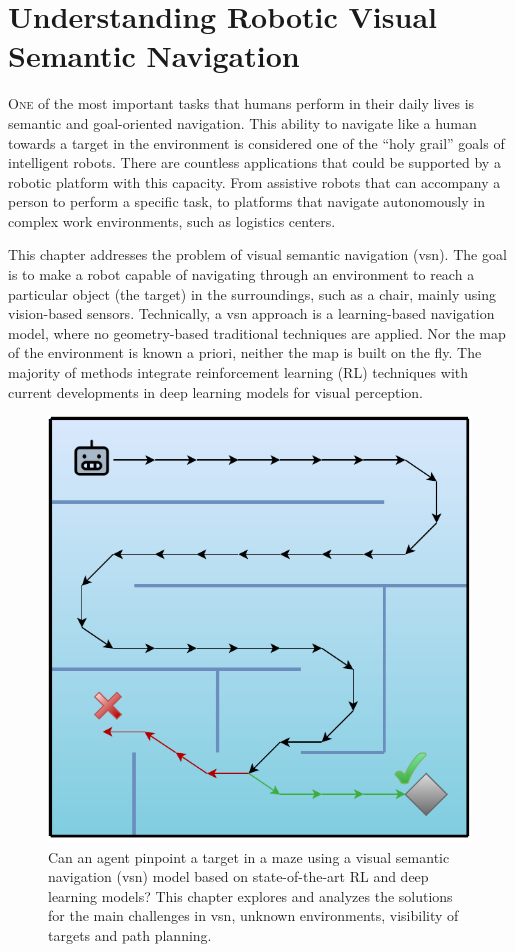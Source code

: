 \chapter{Understanding Robotic Visual Semantic Navigation}\label{ch:understanding-robotic-visual-semantic-navigation}

\lettrine{\textcolor{accent_color}{O}}{ne} of the most important tasks that humans perform in their daily lives is semantic and goal-oriented navigation.
This ability to navigate like a human towards a target in the environment is considered one of the ``holy grail'' goals of intelligent robots.
There are countless applications that could be supported by a robotic platform with this capacity.
From assistive robots that can accompany a person to perform a specific task, to platforms that navigate autonomously in complex work environments, such as logistics centers.

This chapter addresses the problem of visual semantic navigation (\acrshort{vsn}).
The goal is to make a robot capable of navigating through an environment to reach a particular object (the target) in the surroundings, such as a chair, mainly using vision-based sensors.
Technically, a \acrshort{vsn} approach is a learning-based navigation model, where no geometry-based traditional techniques are applied.
Nor the map of the environment is known a priori, neither the map is built on the fly.
The majority of methods integrate reinforcement learning (RL) techniques with current developments in deep learning models for visual perception.

\begin{figure}
  \centering
   \includegraphics[width=0.6\linewidth]{figures/understanding_vsn/graphical_abstract}
   \caption{Can an agent pinpoint a target in a maze using a visual semantic navigation (\acrshort{vsn}) model based on state-of-the-art RL and deep learning models? This chapter explores and analyzes the solutions for the main challenges in \acrshort{vsn}, \ie unknown environments, visibility of targets and path planning.}
   \label{fig:graphical_abstract}
\end{figure}

